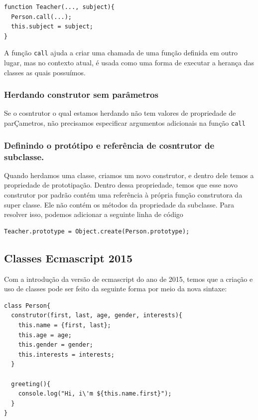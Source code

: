\documentclass[12pt, a4paper]{paper}
\begin{document}
\begin{verbatim}
function Teacher(..., subject){
  Person.call(...);
  this.subject = subject;
}  
\end{verbatim}

A função \texttt{call} ajuda a criar uma chamada de uma função definida em outro lugar,
mas no contexto atual, é usada como uma forma de executar a herança das classes as quais
possuímos.



\subsubsection{Herdando construtor sem parâmetros} %
\label{sec:Herdando construtor sem parâmetros}
Se o cosntrutor o qual estamos herdando não tem valores de propriedade de parÇametros, 
não precisamos especificar argumentos adicionais na função \texttt{call}

\subsubsection{Definindo o protótipo e referência de cosntrutor de subclasse.} %
\label{sec:Definindo o protótipo e referência de cosntrutor de subclasse.}
Quando herdamos uma classe, criamos um novo construtor, e dentro dele temos a 
propriedade de prototipação. Dentro dessa propriedade, temos que esse novo construtor 
por padrão contém uma referência à própria função construtora da super classe. Ele não 
contém os métodos da propriedade da subclasse. Para resolver isso, podemos adicionar 
a seguinte linha de código 

\begin{verbatim}
Teacher.prototype = Object.create(Person.prototype);
\end{verbatim}

\subsection{Classes Ecmascript 2015} %
\label{sub:Classes Ecmascript 2015}
Com a introdução da versão de ecmascript do ano de 2015, temos que a criação e uso de 
classes pode ser feito da seguinte forma por meio da nova sintaxe:

\begin{verbatim}
class Person{
  construtor(first, last, age, gender, interests){
    this.name = {first, last};
    this.age = age;
    this.gender = gender;
    this.interests = interests;
  }

  greeting(){
    console.log("Hi, i\'m ${this.name.first}");
  }
}  
\end{verbatim}
\end{document}
